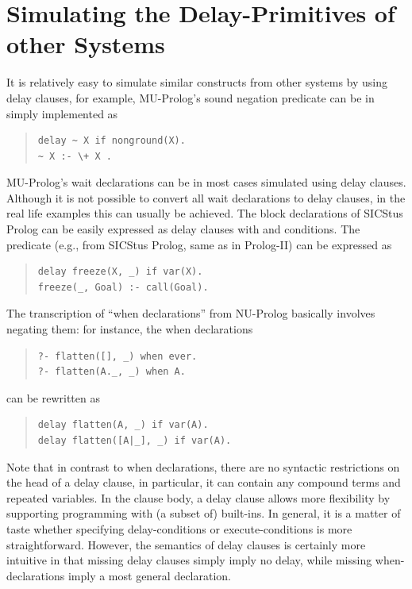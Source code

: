 


\section{Simulating the Delay-Primitives of other Systems}
It is relatively easy to simulate similar constructs from other
systems by using delay clauses,
for example, MU-Prolog's sound negation predicate 
can be in {\eclipse} simply implemented as
\begin{quote}
\begin{verbatim}
delay ~ X if nonground(X).
~ X :- \+ X .
\end{verbatim}
\end{quote}
MU-Prolog's wait declarations can be in most cases
simulated using delay clauses.
Although it is not possible to convert all wait declarations
to delay clauses, in the real life examples
this can usually be achieved.
The block declarations of SICStus Prolog can be easily expressed
as delay clauses with  and
 conditions.
The  predicate (e.g., from SICStus Prolog, same as
 in Prolog-II) can be expressed as
\begin{quote}
\begin{verbatim}
delay freeze(X, _) if var(X).
freeze(_, Goal) :- call(Goal).
\end{verbatim}
\end{quote}
The transcription of ``when declarations'' from NU-Prolog
basically involves negating them:
for instance, the when declarations
\begin{quote}
\begin{verbatim}
?- flatten([], _) when ever.
?- flatten(A._, _) when A.
\end{verbatim}
\end{quote}
can be rewritten as
\begin{quote}
\begin{verbatim}
delay flatten(A, _) if var(A).
delay flatten([A|_], _) if var(A).
\end{verbatim}
\end{quote}
Note that in contrast to when declarations,
there are no syntactic restrictions on the head of a delay clause,
in particular, it can contain any compound terms and repeated variables.
In the clause body, a delay clause allows more flexibility by supporting
programming with (a subset of) built-ins.
In general, it is a matter of taste whether specifying delay-conditions
or execute-conditions is more straightforward.
However, the semantics of delay clauses is certainly more intuitive in
that missing delay clauses simply imply no delay, while missing
when-declarations imply a most general  declaration.


